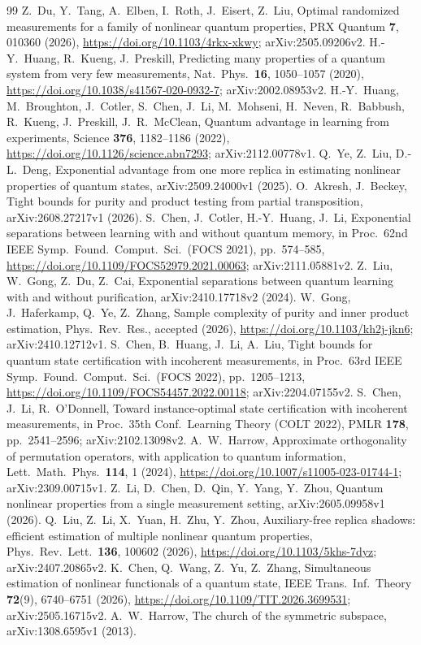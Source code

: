 \documentclass[pdflatex,sn-mathphys-num]{sn-jnl}%
\theoremstyle{thmstyleone}
\theoremstyle{thmstylethree}
\theoremstyle{thmstyletwo}
\begin{document}
{\sloppy\begin{thebibliography}{99}\itemsep2pt
 Z.~Du, Y.~Tang, A.~Elben, I.~Roth, J.~Eisert, Z.~Liu, Optimal randomized measurements for a family of
nonlinear quantum properties, PRX Quantum \textbf{7}, 010360 (2026), \url{https://doi.org/10.1103/4rkx-xkwy};
arXiv:2505.09206v2.
 H.-Y.~Huang, R.~Kueng, J.~Preskill, Predicting many properties of a quantum system from very few
measurements, Nat.\ Phys.\ \textbf{16}, 1050--1057 (2020), \url{https://doi.org/10.1038/s41567-020-0932-7};
arXiv:2002.08953v2.
 H.-Y.~Huang, M.~Broughton, J.~Cotler, S.~Chen, J.~Li, M.~Mohseni, H.~Neven, R.~Babbush, R.~Kueng,
J.~Preskill, J.~R.~McClean, Quantum advantage in learning from experiments, Science \textbf{376}, 1182--1186 (2022),
\url{https://doi.org/10.1126/science.abn7293}; arXiv:2112.00778v1.
 Q.~Ye, Z.~Liu, D.-L.~Deng, Exponential advantage from one more replica in estimating nonlinear
properties of quantum states, arXiv:2509.24000v1 (2025).
 O.~Akresh, J.~Beckey, Tight bounds for purity and product testing from partial transposition,
arXiv:2608.27217v1 (2026).
 S.~Chen, J.~Cotler, H.-Y.~Huang, J.~Li, Exponential separations between learning with and without
quantum memory, in Proc.\ 62nd IEEE Symp.\ Found.\ Comput.\ Sci.\ (FOCS 2021), pp.~574--585,
\url{https://doi.org/10.1109/FOCS52979.2021.00063}; arXiv:2111.05881v2.
 Z.~Liu, W.~Gong, Z.~Du, Z.~Cai, Exponential separations between quantum learning with and without
purification, arXiv:2410.17718v2 (2024).
 W.~Gong, J.~Haferkamp, Q.~Ye, Z.~Zhang, Sample complexity of purity and inner product estimation,
Phys.\ Rev.\ Res., accepted (2026), \url{https://doi.org/10.1103/kh2j-jkn6}; arXiv:2410.12712v1.
 S.~Chen, B.~Huang, J.~Li, A.~Liu, Tight bounds for quantum state certification with incoherent
measurements, in Proc.\ 63rd IEEE Symp.\ Found.\ Comput.\ Sci.\ (FOCS 2022), pp.~1205--1213,
\url{https://doi.org/10.1109/FOCS54457.2022.00118}; arXiv:2204.07155v2.
 S.~Chen, J.~Li, R.~O'Donnell, Toward instance-optimal state certification with incoherent
measurements, in Proc.\ 35th Conf.\ Learning Theory (COLT 2022), PMLR \textbf{178}, pp.~2541--2596;
arXiv:2102.13098v2.
 A.~W.~Harrow, Approximate orthogonality of permutation operators, with application to quantum
information, Lett.\ Math.\ Phys.\ \textbf{114}, 1 (2024), \url{https://doi.org/10.1007/s11005-023-01744-1};
arXiv:2309.00715v1.
 Z.~Li, D.~Chen, D.~Qin, Y.~Yang, Y.~Zhou, Quantum nonlinear properties from a single measurement
setting, arXiv:2605.09958v1 (2026).
 Q.~Liu, Z.~Li, X.~Yuan, H.~Zhu, Y.~Zhou, Auxiliary-free replica shadows: efficient estimation of
multiple nonlinear quantum properties, Phys.\ Rev.\ Lett.\ \textbf{136}, 100602 (2026),
\url{https://doi.org/10.1103/5khs-7dyz}; arXiv:2407.20865v2.
 K.~Chen, Q.~Wang, Z.~Yu, Z.~Zhang, Simultaneous estimation of nonlinear functionals of a quantum
state, IEEE Trans.\ Inf.\ Theory \textbf{72}(9), 6740--6751 (2026), \url{https://doi.org/10.1109/TIT.2026.3699531};
arXiv:2505.16715v2.
 A.~W.~Harrow, The church of the symmetric subspace, arXiv:1308.6595v1 (2013).
\end{thebibliography}}
\end{document}
